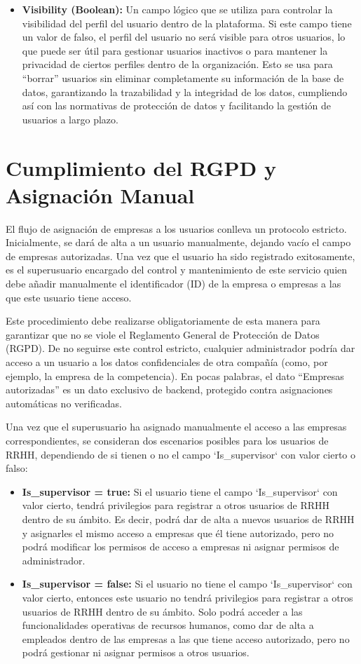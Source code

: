 \begin{itemize}
    \item \textbf{Visibility (Boolean):} Un campo lógico que se utiliza para controlar la visibilidad del perfil del usuario dentro de la plataforma. Si este campo tiene un valor de falso, el perfil del usuario no será visible para otros usuarios, lo que puede ser útil para gestionar usuarios inactivos o para mantener la privacidad de ciertos perfiles dentro de la organización. Esto se usa para ``borrar'' usuarios sin eliminar completamente su información de la base de datos, garantizando la trazabilidad y la integridad de los datos, cumpliendo así con las normativas de protección de datos y facilitando la gestión de usuarios a largo plazo. 
\end{itemize}

\section{Cumplimiento del RGPD y Asignación Manual}

El flujo de asignación de empresas a los usuarios conlleva un protocolo estricto. Inicialmente, se dará de alta a un usuario manualmente, dejando vacío el campo de empresas autorizadas. Una vez que el usuario ha sido registrado exitosamente, es el superusuario encargado del control y mantenimiento de este servicio quien debe añadir manualmente el identificador (ID) de la empresa o empresas a las que este usuario tiene acceso.

Este procedimiento debe realizarse obligatoriamente de esta manera para garantizar que no se viole el Reglamento General de Protección de Datos (RGPD). De no seguirse este control estricto, cualquier administrador podría dar acceso a un usuario a los datos confidenciales de otra compañía (como, por ejemplo, la empresa de la competencia). En pocas palabras, el dato ``Empresas autorizadas'' es un dato exclusivo de backend, protegido contra asignaciones automáticas no verificadas.

Una vez que el superusuario ha asignado manualmente el acceso a las empresas correspondientes, se consideran dos escenarios posibles para los usuarios de RRHH, dependiendo de si tienen o no el campo `Is\_supervisor` con valor cierto o falso:
\begin{itemize}
    \item \textbf{Is\_supervisor = true:} Si el usuario tiene el campo `Is\_supervisor` con valor cierto, tendrá privilegios para registrar a otros usuarios de RRHH dentro de su ámbito. Es decir, podrá dar de alta a nuevos usuarios de RRHH y asignarles el mismo acceso a empresas que él tiene autorizado, pero no podrá modificar los permisos de acceso a empresas ni asignar permisos de administrador.
    \item \textbf{Is\_supervisor = false:} Si el usuario no tiene el campo `Is\_supervisor` con valor cierto, entonces este usuario no tendrá privilegios para registrar a otros usuarios de RRHH dentro de su ámbito. Solo podrá acceder a las funcionalidades operativas de recursos humanos, como dar de alta a empleados dentro de las empresas a las que tiene acceso autorizado, pero no podrá gestionar ni asignar permisos a otros usuarios.
\end{itemize}
